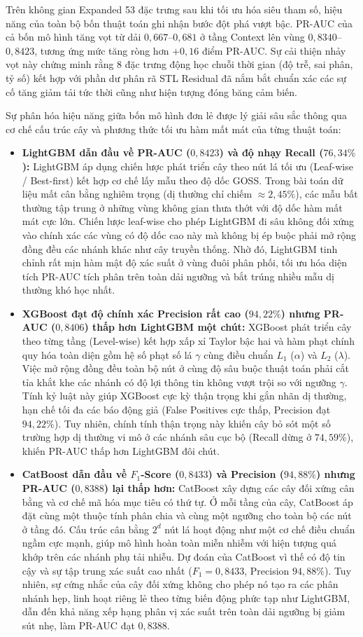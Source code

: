 Trên không gian Expanded 53 đặc trưng sau khi tối ưu hóa siêu tham số, hiệu năng của toàn bộ bốn thuật toán ghi nhận bước đột phá vượt bậc. PR-AUC của cả bốn mô hình tăng vọt từ dải $0{,}667$--$0{,}681$ ở tầng Context lên vùng $0{,}8340$--$0{,}8423$, tương ứng mức tăng ròng hơn $+0{,}16$ điểm PR-AUC. Sự cải thiện nhảy vọt này chứng minh rằng 8 đặc trưng động học chuỗi thời gian (độ trễ, sai phân, tỷ số) kết hợp với phần dư phân rã STL Residual đã nắm bắt chuẩn xác các sự cố tăng giảm tải tức thời cũng như hiện tượng đóng băng cảm biến.

Sự phân hóa hiệu năng giữa bốn mô hình đơn lẻ được lý giải sâu sắc thông qua cơ chế cấu trúc cây và phương thức tối ưu hàm mất mát của từng thuật toán:
\begin{itemize}
    \item \textbf{LightGBM dẫn đầu về PR-AUC ($0{,}8423$) và độ nhạy Recall ($76{,}34\%$):} LightGBM áp dụng chiến lược phát triển cây theo nút lá tối ưu (Leaf-wise / Best-first) kết hợp cơ chế lấy mẫu theo độ dốc GOSS. Trong bài toán dữ liệu mất cân bằng nghiêm trọng (dị thường chỉ chiếm $\approx 2{,}45\%$), các mẫu bất thường tập trung ở những vùng không gian thưa thớt với độ dốc hàm mất mát cực lớn. Chiến lược leaf-wise cho phép LightGBM đi sâu không đối xứng vào chính xác các vùng có độ dốc cao này mà không bị ép buộc phải mở rộng đồng đều các nhánh khác như cây truyền thống. Nhờ đó, LightGBM tinh chỉnh rất mịn hàm mật độ xác suất ở vùng đuôi phân phối, tối ưu hóa diện tích PR-AUC tích phân trên toàn dải ngưỡng và bắt trúng nhiều mẫu dị thường khó học nhất.
    \item \textbf{XGBoost đạt độ chính xác Precision rất cao ($94{,}22\%$) nhưng PR-AUC ($0{,}8406$) thấp hơn LightGBM một chút:} XGBoost phát triển cây theo từng tầng (Level-wise) kết hợp xấp xỉ Taylor bậc hai và hàm phạt chính quy hóa toàn diện gồm hệ số phạt số lá $\gamma$ cùng điều chuẩn $L_1$ ($\alpha$) và $L_2$ ($\lambda$). Việc mở rộng đồng đều toàn bộ nút ở cùng độ sâu buộc thuật toán phải cắt tỉa khắt khe các nhánh có độ lợi thông tin không vượt trội so với ngưỡng $\gamma$. Tính kỷ luật này giúp XGBoost cực kỳ thận trọng khi gắn nhãn dị thường, hạn chế tối đa các báo động giả (False Positives cực thấp, Precision đạt $94{,}22\%$). Tuy nhiên, chính tính thận trọng này khiến cây bỏ sót một số trường hợp dị thường vi mô ở các nhánh sâu cục bộ (Recall dừng ở $74{,}59\%$), khiến PR-AUC thấp hơn LightGBM đôi chút.
    \item \textbf{CatBoost dẫn đầu về $F_1$-Score ($0{,}8433$) và Precision ($94{,}88\%$) nhưng PR-AUC ($0{,}8388$) lại thấp hơn:} CatBoost xây dựng các cây đối xứng cân bằng và cơ chế mã hóa mục tiêu có thứ tự. Ở mỗi tầng của cây, CatBoost áp đặt cùng một thuộc tính phân chia và cùng một ngưỡng cho toàn bộ các nút ở tầng đó. Cấu trúc cân bằng $2^d$ nút lá hoạt động như một cơ chế điều chuẩn ngầm cực mạnh, giúp mô hình hoàn toàn miễn nhiễm với hiện tượng quá khớp trên các nhánh phụ tải nhiễu. Dự đoán của CatBoost vì thế có độ tin cậy và sự tập trung xác suất cao nhất ($F_1 = 0{,}8433$, Precision $94{,}88\%$). Tuy nhiên, sự cứng nhắc của cây đối xứng không cho phép nó tạo ra các phân nhánh hẹp, linh hoạt riêng lẻ theo từng biến động phức tạp như LightGBM, dẫn đến khả năng xếp hạng phân vị xác suất trên toàn dải ngưỡng bị giảm sút nhẹ, làm PR-AUC đạt $0{,}8388$.

\end{itemize}
